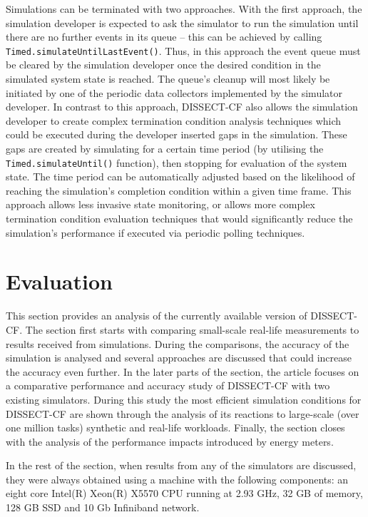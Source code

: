 \documentclass[sort, compress, 5p]{elsarticle}
\begin{document}
Simulations can be terminated with two approaches. With the first approach, the simulation developer is expected to ask the simulator to run the simulation until there are no further events in its queue -- this can be achieved by calling \verb+Timed.simulateUntilLastEvent()+. Thus, in this approach the event queue must be cleared by the simulation developer once the desired condition in the simulated system state is reached. The queue's cleanup will most likely be initiated by one of the periodic data collectors implemented by the simulator developer. In contrast to this approach, DISSECT-CF also allows the simulation developer to create complex termination condition analysis techniques which could be executed during the developer inserted gaps in the simulation. These gaps are created by simulating for a certain time period (by utilising the \verb+Timed.simulateUntil()+ function), then stopping for evaluation of the system state. The time period can be automatically adjusted based on the likelihood of reaching the simulation's completion condition within a given time frame. This approach allows less invasive state monitoring, or allows more complex termination condition evaluation techniques that would significantly reduce the simulation's performance if executed via periodic polling techniques.

\section{Evaluation} \label{sec-eval}

This section provides an analysis of the currently available version of DISSECT-CF. The section first starts with comparing small-scale real-life measurements to results received from simulations. During the comparisons, the accuracy of the simulation is analysed and several approaches are discussed that could increase the accuracy even further. In the later parts of the section, the article focuses on a comparative performance and accuracy study of DISSECT-CF with two existing simulators. During this study the most efficient simulation conditions for DISSECT-CF are shown through the analysis of its reactions to large-scale (over one million tasks) synthetic and real-life workloads. Finally, the section closes with the analysis of the performance impacts introduced by energy meters.

In the rest of the section, when results from any of the simulators are discussed, they were always obtained using a machine with the following components:  an eight core Intel(R) Xeon(R) X5570 CPU   running at 2.93 GHz,  32 GB of memory,  128 GB SSD and  10 Gb Infiniband network.
\end{document}
